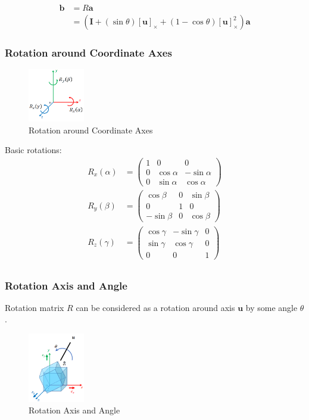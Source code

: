 \begin{align*}
    \bm b &= R \bm a\\
    &= \left(\bm I + (\sin\theta)[\bm u]_\times + (1-\cos\theta)[\bm u]_\times^2\right)\bm a
\end{align*}

\subsubsection{Rotation around Coordinate Axes}\label{subsub:Rotation around Coordinate Axes}
\begin{figure}[H]
    \centering
    \includegraphics[width=0.22\textwidth]{pic/1052/Rotation around Coordinate Axes}
    \caption{Rotation around Coordinate Axes}
\end{figure}

Basic rotations:
\begin{align*}
    R_x(\alpha) &= \begin{pmatrix}
        1 & 0 & 0\\
        0 &\cos\alpha & - \sin \alpha\\
        0 & \sin \alpha & \cos \alpha
    \end{pmatrix}\\
    R_y(\beta) &= \begin{pmatrix}
        \cos\beta & 0 & \sin\beta\\
        0 & 1 & 0\\
        -\sin\beta & 0 & \cos\beta
    \end{pmatrix}\\
    R_z(\gamma) &= \begin{pmatrix}
        \cos\gamma & - \sin \gamma & 0 \\
        \sin \gamma & \cos \gamma & 0 \\
        0 & 0 & 1
    \end{pmatrix}\\
\end{align*}

\subsubsection{Rotation Axis and Angle}
Rotation matrix $R$ can be considered as a rotation around axis $\bm u$ by some angle $\theta$.
\begin{figure}[!htb]
    \centering
    \includegraphics[width=0.22\textwidth]{pic/1052/Rotation Axis and Angle}
    \caption{Rotation Axis and Angle}
\end{figure}

